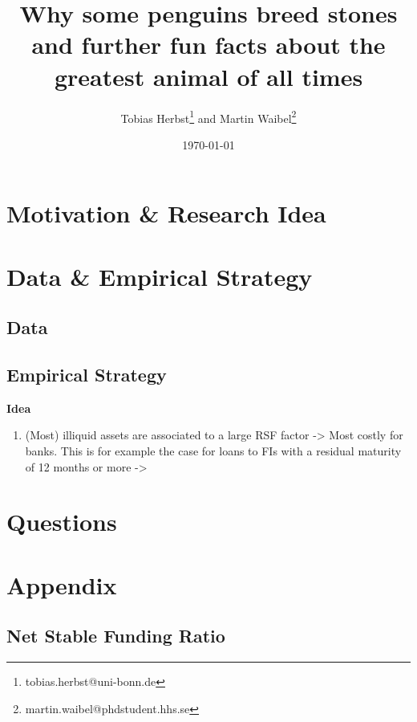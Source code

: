 \documentclass[a4paper,12pt]{article}
\title{Why some penguins breed stones and further fun facts about the greatest animal of all times}
\author{Tobias Herbst\thanks{tobias.herbst@uni-bonn.de} and Martin Waibel\thanks{martin.waibel@phdstudent.hhs.se} }
\date{\today}
\begin{document}
\maketitle

\begin{abstract}
\lipsum[1-1]




\end{abstract}

\clearpage
\section{Motivation \& Research Idea}
\label{motivation}


\section{Data \& Empirical Strategy}
\label{data_strategy}

\subsection{Data}
\label{data}



\subsection{Empirical Strategy}
\label{emp_strategy}

\textbf{Idea}
\begin{enumerate}
	\item (Most) illiquid assets are associated to a large RSF factor -> Most costly for banks. This is for example the case for loans to FIs with a residual maturity of 12 months or more -> 

\end{enumerate}





\section{Questions}
\label{questions}


\clearpage

\section{Appendix}
\subsection{Net Stable Funding Ratio}
\end{document}

